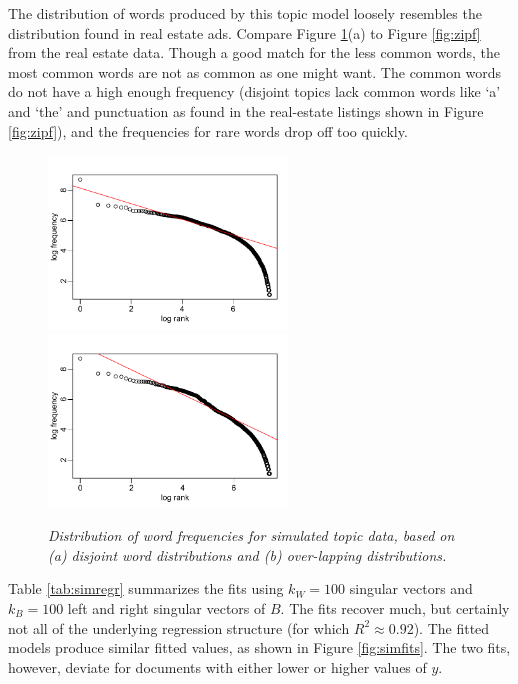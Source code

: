 \documentclass[12pt]{article}
\begin{document}
The distribution of words produced by this topic model  loosely resembles the distribution found in real estate ads.  Compare Figure \ref{fig:simzipf}(a) to Figure \ref{fig:zipf} from the real estate data.  Though a good match for the less common words, the most common words are not as common as one might want.  The common words do not have a high enough frequency (disjoint topics lack common words like `a' and `the' and punctuation as found in the real-estate listings shown in Figure \ref{fig:zipf}), and the frequencies for rare words drop off too quickly.  


\begin{figure}
\caption{ \label{fig:simzipf} { \sl Distribution of word frequencies for simulated
topic data, based on (a) disjoint word distributions and (b) over-lapping distributions.}}
 \centerline{
 \vspace{0.1in}
 \includegraphics[width=2.5in]{figures/simzipfA}  
 \includegraphics[width=2.5in]{figures/simzipfB} }
  \vspace{0.2in}
 \end{figure}


Table \ref{tab:simregr} summarizes the fits using $k_W = 100$ singular vectors and $k_B=100$ left and right singular vectors of $B$.  The fits recover much, but certainly not all of the underlying regression structure (for which $R^2 \approx 0.92$).  The fitted models produce similar fitted values, as shown in Figure \ref{fig:simfits}.  The two fits, however, deviate for documents with either lower or higher values of $y$. 

\end{document}

